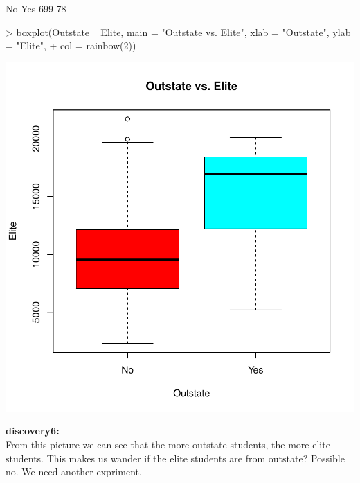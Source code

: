\documentclass[a4paper]{article}
\begin{document}
\begin{enumerate}
\begin{Schunk}
\begin{Soutput}
 No Yes 
699  78 
\end{Soutput}
\begin{Sinput}
> boxplot(Outstate ~ Elite, main = "Outstate vs. Elite", xlab = "Outstate", ylab = "Elite",
+         col = rainbow(2))
\end{Sinput}
\end{Schunk}
\includegraphics{introduction-outstate-elite}

{
\colorbox{BurntOrange}{\textbf{discovery6:}}\color{red}\\
From this picture we can see that the more outstate students, the more elite students. This makes us wander if the elite students are from outstate? Possible no. We need another expriment.
}



\end{enumerate}
\end{document}
